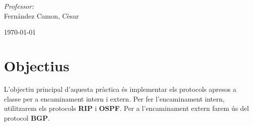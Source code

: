 \documentclass[10pt]{article}
\begin{document}
\begin{center}
\begin{minipage}{0.46\textwidth}
\begin{flushleft}
\end{flushleft}                                                                     %
\end{minipage}      
\begin{minipage}{0.52\textwidth}        
\vspace{-0.6cm}                                         %
\begin{flushright} \large                                                           %
\emph{Professor:} \\                                                                 %
Fernández Camon, Cèsar                                                    %
\end{flushright}                                                                    %
\end{minipage}  
\vspace*{1cm}
    

\begin{center}                                                                                  
{\large \today}                                                                 %
            \end{center}                                                                        
\end{center}                                                                        
                                                                                    
\newpage                                                                        

\tableofcontents
\listoffigures 
\listoftables

\newpage

\section{Objectius}
L'objectiu principal d'aquesta pràctica és implementar els protocols apresos a classe per a encaminament intern i extern. Per fer l'encaminament intern, utilitzarem els protocols \textbf{RIP} i \textbf{OSPF}. Per a l'encaminament extern farem ús del protocol \textbf{BGP}.
\end{document}
